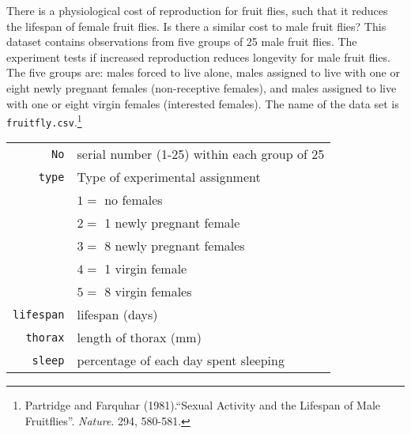 \documentclass[12pt,letterpaper]{article}
\begin{document}
There is a physiological cost of reproduction for fruit flies, such that it reduces the lifespan of female fruit flies.  Is there a similar cost to male fruit flies?  This dataset contains observations from five groups of 25 male fruit flies. The experiment tests if increased reproduction reduces longevity for male fruit flies. The five groups are: males forced to live alone, males assigned to live with one or eight newly pregnant females (non-receptive females), and males assigned to live with one or eight virgin females (interested females). The name of the data set is \texttt{fruitfly.csv}.\footnote{Partridge and Farquhar (1981).``Sexual Activity and the Lifespan of Male Fruitflies''. \textit{Nature}. 294, 580-581.}
	\vspace{1cm}

\begin{tabular}{r|l}
	\texttt{No} & serial number (1-25) within each group of 25\\
	\texttt{type} & Type of experimental assignment \\
	& \hspace{0.1in} $1=$ no females  \\
	& \hspace{0.1in} $2=$ 1 newly pregnant female \\
	& \hspace{0.1in} $3=$ 8 newly pregnant females\\
	& \hspace{0.1in} $4=$ 1 virgin female\\
	& \hspace{0.1in} $5=$ 8 virgin females\\
	\texttt{lifespan} & lifespan (days)\\
	\texttt{thorax} & length of thorax (mm)\\
	\texttt{sleep} & percentage of each day spent sleeping\\
\end{tabular}
	\vspace{1cm}
	
\end{document}
